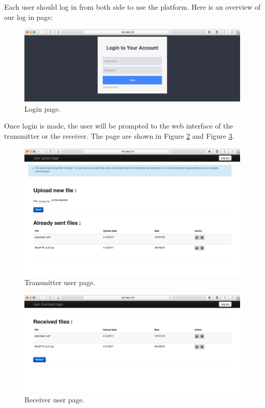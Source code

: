 \documentclass[a4paper,10pt]{article}
\begin{document}
Each user should log in from both side to use the platform. Here is an overview of our log in page:

\begin{figure}[!h]
\centering
\includegraphics[scale=0.35]{images/login.png}
\caption{Login page.}
\label{fig:logpage}
\end{figure}

Once login is made, the user will be prompted to the web interface of the transmitter or the receiver. The page are shown in Figure \ref{fig:transuserpage} and Figure \ref{fig:receiveruserpage}.


\begin{figure}[!h]
\centering
\includegraphics[scale=0.35]{images/usertransmitter.png}
\caption{Transmitter user page.}
\label{fig:transuserpage}
\end{figure}

\begin{figure}[!h]
\centering
\includegraphics[scale=0.35]{images/userreceiver.png}
\caption{Receiver user page.}
\label{fig:receiveruserpage}
\end{figure}
\end{document}
